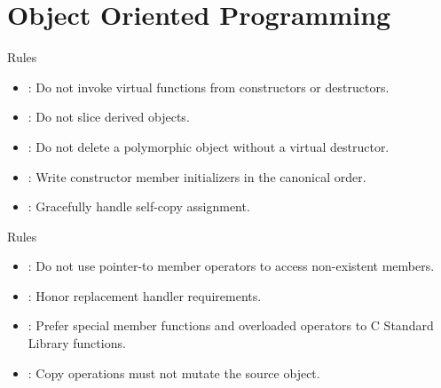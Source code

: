 \section{Object Oriented Programming}

\begin{frame}[t]{Rules}
\begin{itemize}
  \item {}: 
        Do not invoke virtual functions from constructors or destructors.
  \vfill
  \item {}: 
        Do not slice derived objects.
  \vfill
  \item {}: 
        Do not delete a polymorphic object without a virtual destructor.
  \vfill
  \item {}: 
        Write constructor member initializers in the canonical order.
  \vfill
  \item {}: 
        Gracefully handle self-copy assignment.
\end{itemize}
\end{frame}

\begin{frame}[t]{Rules}
\begin{itemize}
  \item {}: 
        Do not use pointer-to member operators to access non-existent members.
  \vfill
  \item {}: 
        Honor replacement handler requirements.
  \vfill
  \item {}: 
        Prefer special member functions and overloaded operators to C Standard Library functions.
  \vfill
  \item {}: 
        Copy operations must not mutate the source object.
\end{itemize}
\end{frame}


